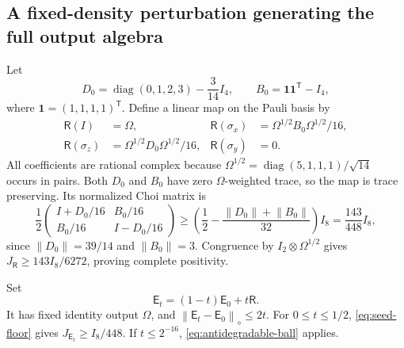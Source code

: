\documentclass[11pt,reqno]{amsart}
\theoremstyle{definition}
\theoremstyle{remark}
\numberwithin{equation}{section}
\DeclareMathOperator{\diag}{diag}
\newcommand{\B}{\mathcal B}
\newcommand{\E}{\mathsf E}
\newcommand{\R}{\mathsf R}
\newcommand{\one}{\mathbf 1}
\newcommand{\norm}[1]{\left\lVert#1\right\rVert}
\begin{document}
\subsection{A fixed-density perturbation generating the full output algebra}

Let
\[
 D_0=\diag(0,1,2,3)-\frac3{14}I_4,\qquad
 B_0=\one\one^{\mathsf T}-I_4,
\]
where $\one=(1,1,1,1)^{\mathsf T}$. Define a linear map on the Pauli basis by
\begin{equation}\label{eq:endpoint}
 \begin{aligned}
 \R(I)&=\Omega,& \R(\sigma_x)&=\Omega^{1/2}B_0\Omega^{1/2}/16,\\
 \R(\sigma_z)&=\Omega^{1/2}D_0\Omega^{1/2}/16,& \R(\sigma_y)&=0.
 \end{aligned}
\end{equation}
All coefficients are rational complex because $\Omega^{1/2}=\diag(5,1,1,1)/\sqrt{14}$ occurs in pairs. Both $D_0$ and $B_0$ have zero $\Omega$-weighted trace, so the map is trace preserving. Its normalized Choi matrix is
\[
 \frac12\begin{pmatrix}I+D_0/16&B_0/16\\B_0/16&I-D_0/16\end{pmatrix}
 \ge\left(\frac12-\frac{\norm{D_0}+\norm{B_0}}{32}\right)I_8
 =\frac{143}{448}I_8,
\]
since $\norm{D_0}=39/14$ and $\norm{B_0}=3$. Congruence by $I_2\otimes\Omega^{1/2}$ gives $J_\R\ge143I_8/6272$, proving complete positivity.

Set
\begin{equation}\label{eq:family-Et}
 \E_t=(1-t)\E_0+t\R.
\end{equation}
It has fixed identity output $\Omega$, and $\norm{\E_t-\E_0}_\diamond\le2t$. For $0\le t\le1/2$, \eqref{eq:seed-floor} gives $J_{\E_t}\ge I_8/448$. If $t\le2^{-16}$, \eqref{eq:antidegradable-ball} applies.
\end{document}
